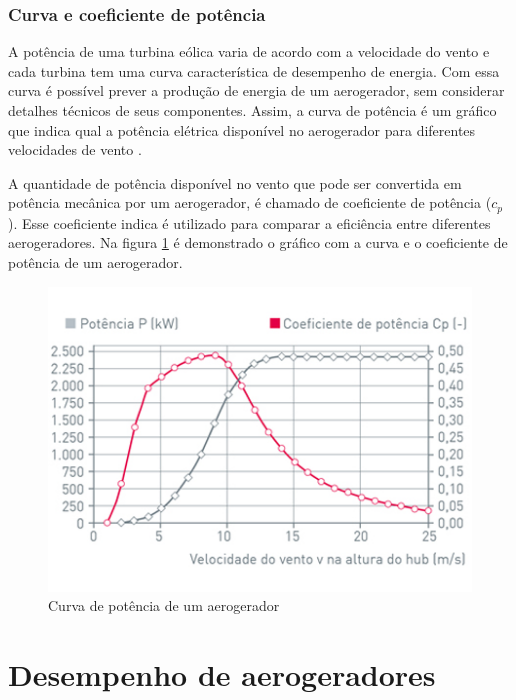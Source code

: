 \subsubsection{Curva e coeficiente de potência}
\label{Sec:curvaDePotencia}

A potência de uma turbina eólica varia de acordo com a velocidade do vento e cada turbina tem uma curva característica de desempenho de energia. Com essa curva é possível prever a produção de energia de um aerogerador, sem considerar detalhes técnicos de seus componentes. Assim, a curva de potência é um gráfico que indica qual a potência elétrica disponível no aerogerador para diferentes velocidades de vento \cite{iec-power-performance}.

A quantidade de potência disponível no vento que pode ser convertida em potência mecânica por um aerogerador, é chamado de coeficiente de potência ($c_p$). Esse coeficiente indica é utilizado para comparar a eficiência entre diferentes aerogeradores. Na figura \ref{Fig:ilustracaoCurvaPotencia} é demonstrado o gráfico com a curva e o coeficiente de potência de um aerogerador. 

\begin{figure}[htbp!] \begin{center}
\includegraphics[width=0.75\linewidth]{./figuras/curva-potencia-wobben}
\caption{Curva de potência de um aerogerador}
\label{Fig:ilustracaoCurvaPotencia}
\end{center} 
\end{figure}

\section{Desempenho de aerogeradores}
\label{Sec:desempenhoDeAerogeradores}

